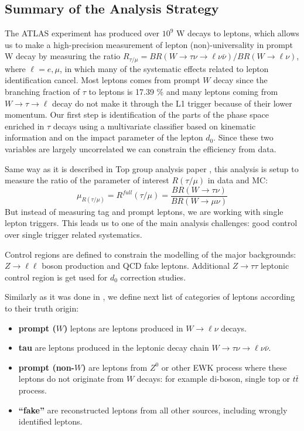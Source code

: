\subsection{Summary of the Analysis Strategy}

The ATLAS experiment has produced over $10^9$ W decays to leptons, which allows us to make a high-precision measurement of lepton (non)-universality in prompt W decay by measuring the ratio $R_{\tau/\mu} =  BR (W\to \tau\nu \to \ell\nu\bar{\nu}) / BR (W \to \ell\nu)$, where $\ell = e, \mu$,  in which many of the systematic effects related to lepton identification cancel. 
Most leptons comes from prompt $W$ decay since the branching fraction of $\tau$ to leptons is 17.39 \% and many leptons coming from $W\to\tau\to \ell$ decay do not make it through the L1 trigger because of their lower momentum. 
Our first step is identification of the parts of the phase space enriched in $\tau$ decays using a multivariate classifier based on kinematic information and on the impact parameter of the lepton $d_0$.
Since these two variables are largely uncorrelated we can constrain the efficiency from data.

Same way as it is described in Top group analysis paper \cite{Mcfayden:2667199}, this analysis is setup to measure the ratio of the parameter of interest $R(\tau/\mu)$ in data and MC:
\begin{equation}
  \label{eq:fit_poi}
  \mu_{R(\tau/\mu)} = R^{full}(\tau/\mu) = \frac{BR(W\to\tau\nu)}{BR(W\to\mu\nu)}
\end{equation}
But instead of measuring tag and prompt leptons, we are working with single lepton triggers. 
This leads us to one of the main analysis challenges: good control over single trigger related systematics.


Control regions are defined to constrain the modelling of the major backgrounds: $Z\to\ell\ell$ boson production and QCD fake leptons.
Additional $Z\to\tau\tau$ leptonic control region is get used for $d_0$ correction studies.

Similarly as it was done in \cite{Mcfayden:2667199}, we define next list of categories of leptons according to their truth origin:
\begin{itemize}
\item \textbf{prompt ($W$)} leptons are leptons produced in $W\to\ell\nu$ decays.
\item \textbf{tau} are leptons produced in the leptonic decay chain $W \to \tau\nu \to \ell\nu\bar{\nu}$.
\item \textbf{prompt (non-$W$)} are leptons from $Z^0$ or other EWK process where these leptons do not originate from $W$ decays: for example di-boson, single top or $t\bar{t}$ process.
\item \textbf{``fake''} are reconstructed leptons from all other sources, including wrongly identified leptons.
\end{itemize}


